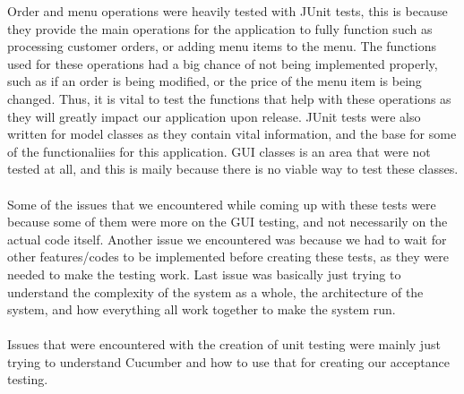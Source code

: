 Order and menu operations were heavily tested with JUnit tests, this is because they provide the main operations for the application to fully function such as processing customer orders, or adding menu items to the menu. The functions used for these operations had a big chance of not being implemented properly, such as if an order is being modified, or the price of the menu item is being changed. Thus, it is vital to test the functions that help with these operations as they will greatly impact our application upon release. JUnit tests were also written for model classes as they contain vital information, and the base for some of the functionaliies for this application. GUI classes is an area that were not tested at all, and this is maily because there is no viable way to test these classes. \\ \\
Some of the issues that we encountered while coming up with these tests were because some of them were more on the GUI testing, and not necessarily on the actual code itself. Another issue we encountered was because we had to wait for other features/codes to be implemented before creating these tests, as they were needed to make the testing work. Last issue was basically just trying to understand the complexity of the system as a whole, the architecture of the system, and how everything all work together to make the system run. \\ \\ Issues that were encountered with the creation of unit testing were mainly just trying to understand Cucumber and how to use that for creating our acceptance testing. \\

